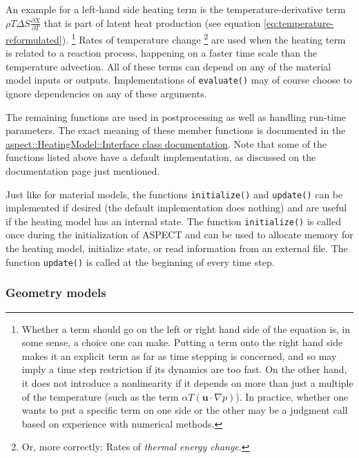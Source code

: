 \documentclass{article}
\newcommand{\aspect}{\textsc{ASPECT}}
\begin{document}
An example for a left-hand side heating term is the temperature-derivative term
$\rho T \Delta S \frac{\partial X}{\partial T}$ that is part of latent heat production
(see equation \eqref{eq:temperature-reformulated}).%
\footnote{Whether a term should go on the left or right hand side of
  the equation is, in some sense, a choice one can make. Putting a
  term onto the right hand side makes it an explicit term as far as
  time stepping is concerned, and so may imply a time step restriction
  if its dynamics are too fast. On the other hand, it does not
  introduce a nonlinearity if it depends on more than just a multiple
  of the temperature (such as the term $\alpha T \left( \mathbf u
  \cdot \nabla p \right)$). In practice, whether one wants to put a
  specific term on one side or the other may be a judgment call based
  on experience with numerical methods.}
Rates of temperature change%
\footnote{Or, more correctly: Rates of \textit{thermal energy change}.}
are used when the heating term is related to a reaction process, happening
on a faster time scale than the temperature advection.
All of these terms can depend on any of the material model inputs or outputs.
Implementations of \texttt{evaluate()} may of course choose to ignore dependencies on any
of these arguments.

The remaining functions are used in postprocessing as well as
handling run-time parameters. The exact meaning of these member functions is
documented in the
\href{doc/doxygen/classaspect_1_1HeatingModel_1_1Interface.html}{aspect::HeatingModel::Interface
class documentation}. Note that some of the functions listed above have a
default implementation, as discussed on the documentation page just
mentioned.

Just like for material models, the functions \texttt{initialize()} and \texttt{update()} can be
implemented if desired (the default implementation does
nothing) and are useful if the heating model has an internal state. The function \texttt{initialize()} is called once during
the initialization of \aspect{} and can be used to allocate memory for
the heating model, initialize state, or read information from
an external file. The function \texttt{update()} is called at the beginning of every time step.


\subsubsection{Geometry models}
\label{sec:geometry-models}
\end{document}
